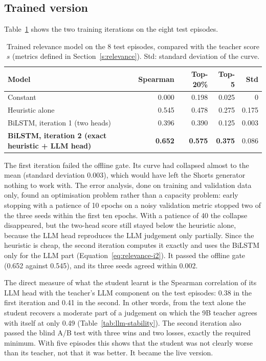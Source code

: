 \subsection*{Trained version}

Table~\ref{tab:relevance} shows the two training iterations on the eight test episodes.

\begin{table}[H]
\centering
\caption{Trained relevance model on the 8 test episodes, compared with the teacher score $s$ (metrics defined in Section~\ref{s:relevance}). Std: standard deviation of the curve.}
\label{tab:relevance}
\small
\begin{tabular}{@{}p{6.2cm}rrrr@{}}
\toprule
\textbf{Model} & \textbf{Spearman} & \textbf{Top-20\%} & \textbf{Top-5} & \textbf{Std} \\
\midrule
Constant & 0.000 & 0.198 & 0.025 & 0 \\
Heuristic alone & 0.545 & 0.478 & 0.275 & 0.175 \\
BiLSTM, iteration 1 (two heads) & 0.396 & 0.390 & 0.125 & 0.003 \\
\textbf{BiLSTM, iteration 2 (exact heuristic + LLM head)} & \textbf{0.652} & \textbf{0.575} & \textbf{0.375} & 0.086 \\
\bottomrule
\end{tabular}
\end{table}

The first iteration failed the offline gate. Its curve had collapsed almost to the mean (standard deviation 0.003), which would have left the Shorts generator nothing to work with. The error analysis, done on training and validation data only, found an optimisation problem rather than a capacity problem: early stopping with a patience of 10 epochs on a noisy validation metric stopped two of the three seeds within the first ten epochs. With a patience of 40 the collapse disappeared, but the two-head score still stayed below the heuristic alone, because the LLM head reproduces the LLM judgement only partially. Since the heuristic is cheap, the second iteration computes it exactly and uses the BiLSTM only for the LLM part (Equation~\ref{eq:relevance-i2}). It passed the offline gate (0.652 against 0.545), and its three seeds agreed within 0.002.

The direct measure of what the student learnt is the Spearman correlation of its LLM head with the teacher's LLM component on the test episodes: 0.38 in the first iteration and 0.41 in the second. In other words, from the text alone the student recovers a moderate part of a judgement on which the 9B teacher agrees with itself at only 0.49 (Table~\ref{tab:llm-stability}). The second iteration also passed the blind A/B test with three wins and two losses, exactly the required minimum. With five episodes this shows that the student was not clearly worse than its teacher, not that it was better. It became the live version.

